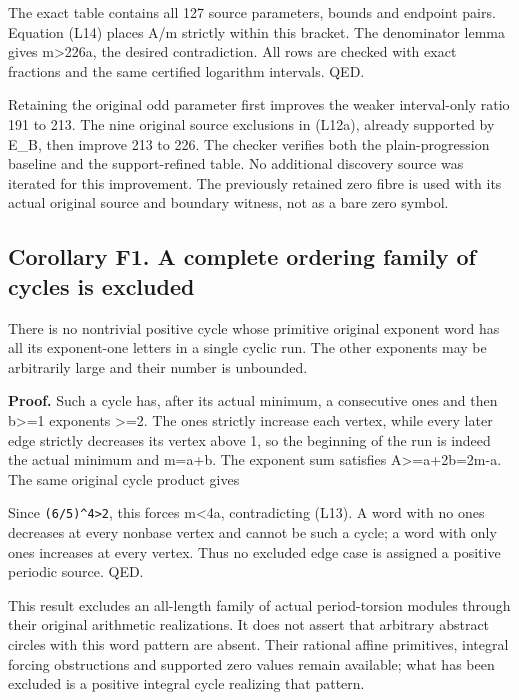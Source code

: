 
The exact table contains all 127 source parameters, bounds and endpoint
pairs. Equation (L14) places A/m strictly within this bracket. The
denominator lemma gives m\textgreater226a, the desired contradiction.
All rows are checked with exact fractions and the same certified
logarithm intervals. QED.

Retaining the original odd parameter first improves the weaker
interval-only ratio 191 to 213. The nine original source exclusions in
(L12a), already supported by E\_B, then improve 213 to 226. The checker
verifies both the plain-progression baseline and the support-refined
table. No additional discovery source was iterated for this improvement.
The previously retained zero fibre is used with its actual original
source and boundary witness, not as a bare zero symbol.

\subsection{Corollary F1. A complete ordering family of cycles is
excluded}

There is no nontrivial positive cycle whose primitive original exponent
word has all its exponent-one letters in a single cyclic run. The other
exponents may be arbitrarily large and their number is unbounded.

\textbf{Proof.} Such a cycle has, after its actual minimum, a
consecutive ones and then b\textgreater=1 exponents \textgreater=2. The
ones strictly increase each vertex, while every later edge strictly
decreases its vertex above 1, so the beginning of the run is indeed the
actual minimum and m=a+b. The exponent sum satisfies
A\textgreater=a+2b=2m-a. The same original cycle product gives


Since \nolinkurl{(6/5)^4>2}, this forces m\textless4a, contradicting
(L13). A word with no ones decreases at every nonbase vertex and cannot
be such a cycle; a word with only ones increases at every vertex. Thus
no excluded edge case is assigned a positive periodic source. QED.

This result excludes an all-length family of actual period-torsion
modules through their original arithmetic realizations. It does not
assert that arbitrary abstract circles with this word pattern are
absent. Their rational affine primitives, integral forcing obstructions
and supported zero values remain available; what has been excluded is a
positive integral cycle realizing that pattern.

